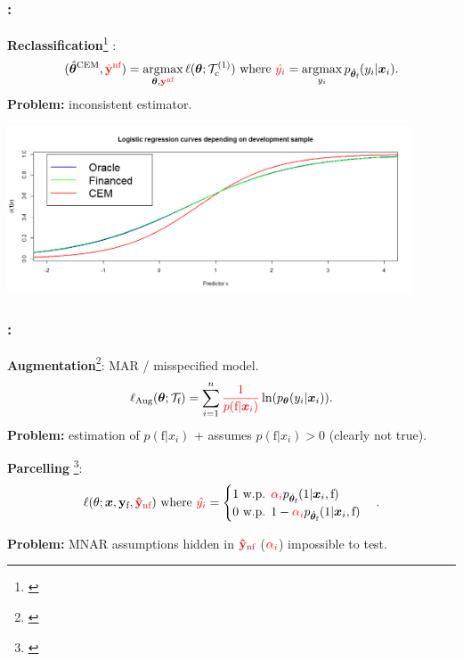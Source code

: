 \documentclass[english,xcolor={rgb,dvipsnames,table,usenames}]{beamer}
\DeclareMathOperator*{\argmax}{\arg\!\max}
\newcommand{\f}{\text{f}}
\newcommand{\nf}{\text{nf}}
\begin{document}
 
 
 
 
 
 \begin{frame}
\frametitle{\secname : \subsecname}

\textbf{Reclassification}\footnote{\cite{RI6,banasik,saporta}} :
\[(\hat{\bm{\theta}}^{\text{CEM}}, \textcolor{red}{\hat{\mathbf{y}}^{\nf}}) = \argmax_{\bm{\theta},\textcolor{red}{\mathbf{{y}}^{\nf}}} \ell(\bm{\theta}; \mathcal{T}_c^{(1)}) \text{ where } \textcolor{red}{\hat{y_i}} = \argmax_{y_i} p_{\hat{\bm{\theta}}_{\f}}(y_i|\bm{x}_i).\]
\textbf{Problem:} inconsistent estimator.

\vspace*{0.2cm}
\hspace*{-0.8cm} \centering \includegraphics[width=12cm]{figures/CEM_bias.png}

\end{frame}


\begin{frame}
\frametitle{\secname : \subsecname}

\textbf{Augmentation}\footnote{\cite{RI6,banasik,saporta,economix}}: MAR / misspecified model.
\[ \ell_{\text{Aug}}(\bm{\theta}; \mathcal{T}_\f) = \sum_{i=1}^n \textcolor{red}{\frac{1}{p(\text{f}|\bm{x}_i)}} \ln(p_{\bm{\theta}}(y_i|\bm{x}_i)).\]
\textbf{Problem:} estimation of $p(\text{f}|x_i)$ + assumes $p(\text{f}|x_i) > 0$ (clearly not true).

\medskip

\noindent\makebox[\linewidth]{\rule{\paperwidth}{1pt}}

\medskip

\textbf{Parcelling} \footnote{\cite{RI6,banasik,saporta}}:
\[ \ell(\theta; \bm{x},\mathbf{y}_{\f},\textcolor{red}{\mathbf{\hat{y}}_{\nf}}) \text{ where } \textcolor{red}{\hat{y_i}} = \begin{cases} 1 \text{ w.p. } \textcolor{red}{\alpha_i} p_{\hat{\bm{\theta}}_{\f}}(1|\bm{x}_i,\text{f}) \\ 0 \text{ w.p. } 1-\textcolor{red}{\alpha_i} p_{\hat{\bm{\theta}}_{\f}}(1|\bm{x}_i,\text{f}) \end{cases}. \]

\textbf{Problem:} MNAR assumptions hidden in $\textcolor{red}{\mathbf{\hat{y}}_{\nf}}$ ($\textcolor{red}{\alpha_i}$) impossible to test.

\end{frame}
\end{document}
